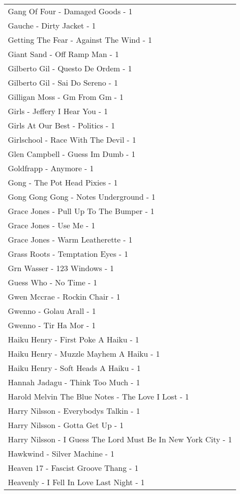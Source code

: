 \documentclass[
]{article}
\begin{document}
\begin{longtable}{l}
Gang Of Four - Damaged Goods - 1 \\ 
Gauche - Dirty Jacket - 1 \\ 
Getting The Fear - Against The Wind - 1 \\ 
Giant Sand - Off Ramp Man - 1 \\ 
Gilberto Gil - Questo De Ordem - 1 \\ 
Gilberto Gil - Sai Do Sereno - 1 \\ 
Gilligan Moss - Gm From Gm - 1 \\ 
Girls - Jeffery I Hear You - 1 \\ 
Girls At Our Best - Politics - 1 \\ 
Girlschool - Race With The Devil - 1 \\ 
Glen Campbell - Guess Im Dumb - 1 \\ 
Goldfrapp - Anymore - 1 \\ 
Gong - The Pot Head Pixies - 1 \\ 
Gong Gong Gong - Notes Underground - 1 \\ 
Grace Jones - Pull Up To The Bumper - 1 \\ 
Grace Jones - Use Me - 1 \\ 
Grace Jones - Warm Leatherette - 1 \\ 
Grass Roots - Temptation Eyes - 1 \\ 
Grn Wasser - 123 Windows - 1 \\ 
Guess Who - No Time - 1 \\ 
Gwen Mccrae - Rockin Chair - 1 \\ 
Gwenno - Golau Arall - 1 \\ 
Gwenno - Tir Ha Mor - 1 \\ 
Haiku Henry - First Poke A Haiku - 1 \\ 
Haiku Henry - Muzzle Mayhem A Haiku - 1 \\ 
Haiku Henry - Soft Heads A Haiku - 1 \\ 
Hannah Jadagu - Think Too Much - 1 \\ 
Harold Melvin The Blue Notes - The Love I Lost - 1 \\ 
Harry Nilsson - Everybodys Talkin - 1 \\ 
Harry Nilsson - Gotta Get Up - 1 \\ 
Harry Nilsson - I Guess The Lord Must Be In New York City - 1 \\ 
Hawkwind - Silver Machine - 1 \\ 
Heaven 17 - Fascist Groove Thang - 1 \\ 
Heavenly - I Fell In Love Last Night - 1 \\ 

\end{longtable}
\end{document}
